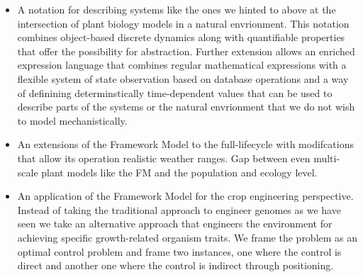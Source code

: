 \documentclass[phd]{infthesis}
\begin{document}
\begin{itemize}
\item A notation for describing systems like the ones we hinted to above at the
  intersection of plant biology models in a natural envrionment. This notation
  combines object-based discrete dynamics along with quantifiable properties
  that offer the possibility for abstraction. Further extension allows an
  enriched expression language that combines regular mathematical expressions
  with a flexible system of state observation based on database operations and a
  way of definining determinstically time-dependent values that can be used to
  describe parts of the systems or the natural envrionment that we do not wish
  to model mechanistically.
\item An extensions of the Framework Model to the full-lifecycle with
  modifcations that allow its operation realistic weather ranges. Gap between
  even multi-scale plant models like the FM and the population and ecology level.
\item An application of the Framework Model for the crop engineering
  perspective. Instead of taking the traditional approach to engineer genomes as
  we have seen we take an alternative approach that engineers the environment
  for achieving specific growth-related organism traits. We frame the problem as
  an optimal control problem and frame two instances, one where the control is
  direct and another one where the control is indirect through positioning.
\end{itemize}

\printbibliography[heading=bibintoc]
\end{document}
